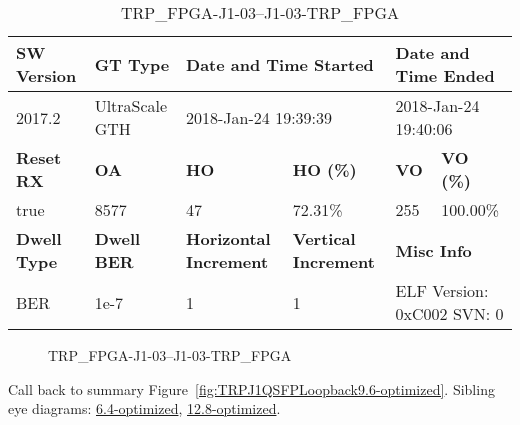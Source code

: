 \begin{table}[h]
\centering
\caption{TRP\_FPGA-J1-03--J1-03-TRP\_FPGA}
\label{tab:TRPFPGAJ103J103TRPFPGA9.6-optimized}
\begin{tabular}{@{}|l|l|l|l|l|l|@{}}
\toprule
\textbf{SW Version}                & \textbf{GT Type}   & \multicolumn{2}{l|}{\textbf{Date and Time Started}}            & \multicolumn{2}{l|}{\textbf{Date and Time Ended}}        \\ \midrule
2017.2                       & UltraScale GTH          & \multicolumn{2}{l|}{2018-Jan-24 19:39:39}                   & \multicolumn{2}{l|}{2018-Jan-24 19:40:06}               \\ \midrule
\textbf{Reset RX}                  & \textbf{OA} & \textbf{HO}   & \textbf{HO (\%)} & \textbf{VO} & \textbf{VO (\%)} \\ \midrule
true & 8577        & 47          & 72.31\%        & 255        & 100.00\%       \\ \midrule
\textbf{Dwell Type}                & \textbf{Dwell BER} & \textbf{Horizontal Increment} & \textbf{Vertical Increment}    & \multicolumn{2}{l|}{\textbf{Misc Info}}                  \\ \midrule
BER                            & 1e-7        & 1        & 1           & \multicolumn{2}{l|}{ELF Version: 0xC002 SVN: 0}                         \\ \bottomrule
\end{tabular}
\end{table}

\begin{figure}[h]
\caption{TRP\_FPGA-J1-03--J1-03-TRP\_FPGA} \label{fig:TRPFPGAJ103J103TRPFPGA9.6-optimized}
\end{figure}

Call back to summary Figure~\ref{fig:TRPJ1QSFPLoopback9.6-optimized}.
Sibling eye diagrams: \hyperref[sec:TRPFPGAJ103J103TRPFPGA6.4-optimized]{6.4-optimized}, \hyperref[sec:TRPFPGAJ103J103TRPFPGA12.8-optimized]{12.8-optimized}.

\clearpage
\newpage

